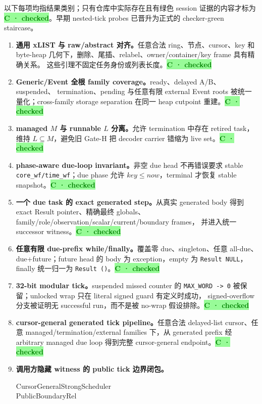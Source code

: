 \documentclass[11pt,a4paper,UTF8]{ctexart}
\newcommand{\checked}{\colorbox{paleGreen}{\textcolor{green}{\textbf{C · checked}}}}
\newcommand{\code}[1]{\nolinkurl{#1}}
\begin{document}
以下每项均指结果类别；只有仓库中实际存在且有绿色 session 证据的内容才标为
\checked。早期 nested-tick probes 已晋升为正式的 checker-green staircase。

\begin{enumerate}
  \item \textbf{通用 xLIST 与 raw/abstract 对齐。}任意合法 ring、节点、cursor、key 和
        byte-heap 几何下，删除、尾插、relabel、owner/container/key frame 具有精确关系。
        这些引理不固定任务身份或列表长度。\checked
  \item \textbf{Generic/Event 全根 family coverage。}ready、delayed A/B、suspended、
        termination、pending 与任意有限 external Event roots 被统一量化；cross-family storage
        separation 在同一 heap cutpoint 重建。\checked
  \item \textbf{managed $M$ 与 runnable $L$ 分离。}允许 termination 中存在 retired task，
        维持 $L\subseteq M$，避免旧 Gate-H 把 decoder carrier 错缩为 live set。\checked
  \item \textbf{phase-aware due-loop invariant。}非空 due head 不再错误要求 stable
        \code{core_wf/time_wf}；due phase 允许 $key\le now$，terminal 才恢复 stable snapshot。\checked
  \item \textbf{一个 due task 的 exact generated step。}从真实 generated body 得到 exact
        Result pointer、精确最终 globals、family/role/observation/scalar/current/boundary frames，
        并进入统一 successor witness。\checked
  \item \textbf{任意有限 due-prefix while/finally。}覆盖零 due、singleton、任意 all-due、
        due+future；future head 的 body 为 exception，empty 为 \code{Result NULL}，finally
        统一归一为 \code{Result ()}。\checked
  \item \textbf{32-bit modular tick。}suspended missed counter 的
        \code{MAX_WORD -> 0} 被保留；unlocked wrap 只在 literal signed guard 有定义时成功，
        signed-overflow 分支被证明无 successful run，而不是被 no-wrap 假设排除。\checked
  \item \textbf{cursor-general generated tick pipeline。}任意合法 delayed-list cursor、任意
        managed/termination/external families 下，从 generated prefix 经 arbitrary managed due loop
        得到完整 cursor-general endpoint。\checked
  \item \textbf{调用方隐藏 witness 的 public tick 边界闭包。}
        \begin{center}\footnotesize\ttfamily
          CursorGeneralStrongScheduler\\[-1mm]PublicBoundaryRel

\end{center}
\end{enumerate}
\end{document}

